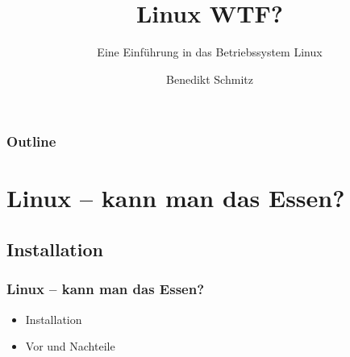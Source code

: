 \documentclass{beamer}
\begin{document}
\title{Linux WTF?}
\subtitle{Eine Einführung in das Betriebssystem Linux}
\author{Benedikt Schmitz}
\date{}



	\begin{frame}[plain]
	  \titlepage
	\end{frame}
	\begin{frame}
  		\frametitle{Outline}
		\tableofcontents
	\end{frame}
	\section{Linux -- kann man das Essen?}
	    \subsection{Installation}
	        \begin{frame}
          		\frametitle{Linux -- kann man das Essen?}
            		\begin{center}
                		\begin{minipage}{0.44\textwidth}
                		    \begin{itemize}
                		        \item Installation
                		        \item Vor und Nachteile
                		    \end{itemize}
                		\end{minipage}%
            		\end{center}
        	\end{frame}
        	
\end{document}
